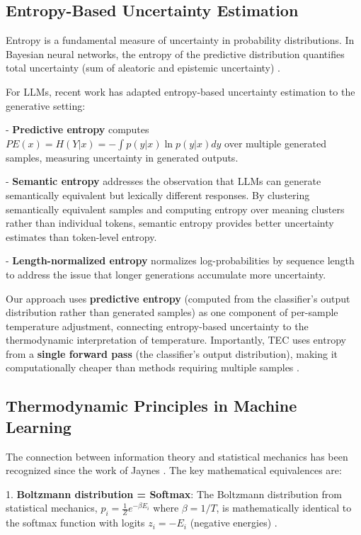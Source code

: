 \documentclass[11pt,letterpaper]{article}
\begin{document}
\subsection{Entropy-Based Uncertainty Estimation}

Entropy is a fundamental measure of uncertainty in probability distributions. In Bayesian neural networks, the entropy of the predictive distribution quantifies total uncertainty (sum of aleatoric and epistemic uncertainty) \cite{Gal2016}.

For LLMs, recent work has adapted entropy-based uncertainty estimation to the generative setting:

- \textbf{Predictive entropy} \cite{Kuhn2023} computes $PE(x) = H(Y|x) = -\int p(y|x) \ln p(y|x) dy$ over multiple generated samples, measuring uncertainty in generated outputs.

- \textbf{Semantic entropy} \cite{Kuhn2023} addresses the observation that LLMs can generate semantically equivalent but lexically different responses. By clustering semantically equivalent samples and computing entropy over meaning clusters rather than individual tokens, semantic entropy provides better uncertainty estimates than token-level entropy.

- \textbf{Length-normalized entropy} \cite{Kuhn2023} normalizes log-probabilities by sequence length to address the issue that longer generations accumulate more uncertainty.

Our approach uses \textbf{predictive entropy} (computed from the classifier's output distribution rather than generated samples) as one component of per-sample temperature adjustment, connecting entropy-based uncertainty to the thermodynamic interpretation of temperature. Importantly, TEC uses entropy from a \textbf{single forward pass} (the classifier's output distribution), making it computationally cheaper than methods requiring multiple samples \cite{Kuhn2023}.

\subsection{Thermodynamic Principles in Machine Learning}

The connection between information theory and statistical mechanics has been recognized since the work of Jaynes \cite{Jaynes1957}. The key mathematical equivalences are:

1. \textbf{Boltzmann distribution = Softmax}: The Boltzmann distribution from statistical mechanics, $p_i = \frac{1}{Z} e^{-\beta E_i}$ where $\beta = 1/T$, is mathematically identical to the softmax function with logits $z_i = -E_i$ (negative energies) \cite{PhysicsSE2023, TowardsAI2023}.
\end{document}
